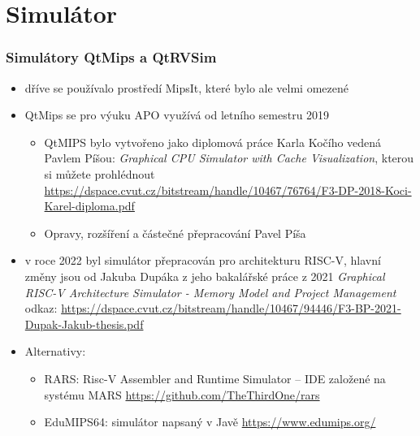 \documentclass{beamer}
\subtitle{Lekce 03. Central Processing Unit (CPU)}
\author{Pavel Píša \phantom{xxxxxxx} Petr Štěpán \\ \small\texttt{pisa@fel.cvut.cz}\phantom{xxxx}\small\texttt{stepan@fel.cvut.cz}}
\begin{document}
\maketitle

\section{Simulátor}

\begin{frame}
\frametitle{Simulátory QtMips a QtRVSim}

\begin{itemize}
\item dříve se používalo prostředí MipsIt, které bylo ale velmi omezené
\item QtMips se pro výuku APO využívá od letního semestru 2019
\begin{itemize}
\item QtMIPS bylo vytvořeno jako diplomová práce Karla Kočího vedená Pavlem Píšou: \textit{Graphical CPU Simulator with Cache Visualization}, kterou si můžete prohlédnout \url{https://dspace.cvut.cz/bitstream/handle/10467/76764/F3-DP-2018-Koci-Karel-diploma.pdf}
\item Opravy, rozšíření a částečné přepracování Pavel Píša
\end{itemize}
\item v roce 2022 byl simulátor přepracován pro architekturu RISC-V, hlavní změny jsou od Jakuba Dupáka z jeho bakalářské práce z 2021 \textit{Graphical RISC-V Architecture Simulator - Memory Model and Project Management} odkaz:
\url{https://dspace.cvut.cz/bitstream/handle/10467/94446/F3-BP-2021-Dupak-Jakub-thesis.pdf}

\item Alternativy:
\begin{itemize}
 \item RARS: Risc-V Assembler and Runtime Simulator -- IDE založené na systému MARS \url{https://github.com/TheThirdOne/rars}
 \item EduMIPS64: simulátor napsaný v Javě \url{https://www.edumips.org/}
\end{itemize}
\end{itemize}

\end{frame}
\end{document}
